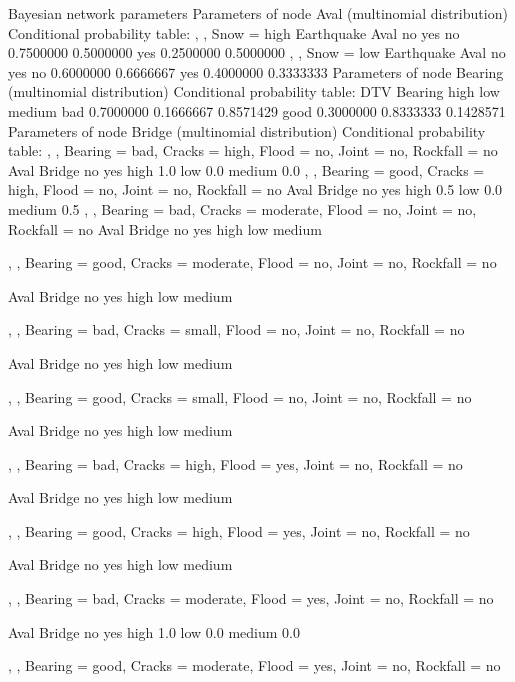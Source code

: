 Bayesian network parameters
  Parameters of node Aval (multinomial distribution)
Conditional probability table:
, , Snow = high
     Earthquake
Aval         no       yes
  no  0.7500000 0.5000000
  yes 0.2500000 0.5000000
, , Snow = low
     Earthquake
Aval         no       yes
  no  0.6000000 0.6666667
  yes 0.4000000 0.3333333
  Parameters of node Bearing (multinomial distribution)
Conditional probability table:
       DTV
Bearing      high       low    medium
   bad  0.7000000 0.1666667 0.8571429
   good 0.3000000 0.8333333 0.1428571
  Parameters of node Bridge (multinomial distribution)
Conditional probability table:
, , Bearing = bad, Cracks = high, Flood = no, Joint = no, Rockfall = no
        Aval
Bridge   no yes
  high      1.0
  low       0.0
  medium    0.0
, , Bearing = good, Cracks = high, Flood = no, Joint = no, Rockfall = no
        Aval
Bridge    no yes
  high   0.5    
  low    0.0    
  medium 0.5    
, , Bearing = bad, Cracks = moderate, Flood = no, Joint = no, Rockfall = no
        Aval
Bridge   no yes
  high         
  low          
  medium       

, , Bearing = good, Cracks = moderate, Flood = no, Joint = no, Rockfall = no

        Aval
Bridge   no yes
  high         
  low          
  medium       

, , Bearing = bad, Cracks = small, Flood = no, Joint = no, Rockfall = no

        Aval
Bridge   no yes
  high         
  low          
  medium       

, , Bearing = good, Cracks = small, Flood = no, Joint = no, Rockfall = no

        Aval
Bridge   no yes
  high         
  low          
  medium       

, , Bearing = bad, Cracks = high, Flood = yes, Joint = no, Rockfall = no

        Aval
Bridge   no yes
  high         
  low          
  medium       

, , Bearing = good, Cracks = high, Flood = yes, Joint = no, Rockfall = no

        Aval
Bridge   no yes
  high         
  low          
  medium       

, , Bearing = bad, Cracks = moderate, Flood = yes, Joint = no, Rockfall = no

        Aval
Bridge   no yes
  high      1.0
  low       0.0
  medium    0.0

, , Bearing = good, Cracks = moderate, Flood = yes, Joint = no, Rockfall = no

